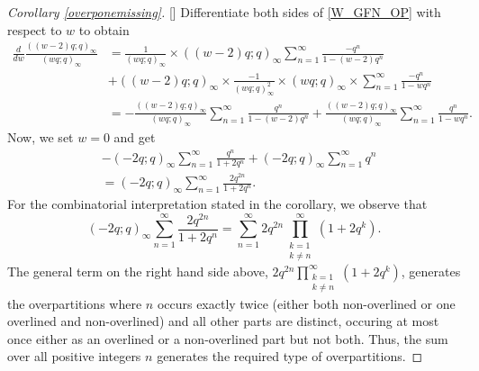 \documentclass[12pt,reqno]{amsart}
\renewcommand{\(}{\left\(}
\renewcommand{\)}{\right\)}
\renewcommand{\[}{\left\[}
\renewcommand{\]}{\right\]}
\numberwithin{equation}{section}
\theoremstyle{plain}
\begin{document}
\begin{proof}[Corollary \textup{\ref{overponemissing}}][]
Differentiate both sides of \eqref{W_GFN_OP} with respect to $w$ to obtain
\begin{align*}
\frac{d}{dw} \frac{((w-2)q; q)_{\infty}}{(wq; q)_{\infty}}&= \frac{1}{(wq; q)_{\infty}} \times ((w-2)q; q)_{\infty} \sum_{n=1}^{\infty}\frac{-q^n}{1 - (w-2) q^n} \\
&+ ((w-2)q; q)_{\infty} \times \frac{-1}{(wq; q)_{\infty}^2} \times (wq; q)_{\infty} \times \sum_{n=1}^{\infty} \frac{-q^n}{1 - wq^n} \\
&= -\frac{((w-2)q; q)_{\infty}}{(wq; q)_{\infty}}\sum_{n=1}^{\infty}\frac{q^n}{1 - (w-2) q^n} + \frac{((w-2)q; q)_{\infty}}{(wq; q)_{\infty}} \sum_{n=1}^{\infty} \frac{q^n}{1 - wq^n}.
\end{align*}
Now, we set $w=0$ and get
\begin{align*}
&-(-2q; q)_{\infty}\sum_{n=1}^{\infty} \frac{q^n}{1 + 2q^n} + (-2q; q)_{\infty}\sum_{n=1}^{\infty}q^n \\
&  = (-2q; q)_{\infty}\sum_{n=1}^{\infty}\frac{2q^{2n}}{1 + 2q^n}.
\end{align*}
For the combinatorial interpretation stated in the corollary, we observe that
\begin{equation*}
(-2q; q)_{\infty}\sum_{n=1}^{\infty}\frac{2q^{2n}}{1 + 2q^n} = \sum_{n=1}^{\infty} 2q^{2n} \prod_{\substack{k=1 \\ k \neq n}}^{\infty} (1+2q^k).
\end{equation*}
The general term on the right hand side above, $2q^{2n} \prod_{\substack{k=1 \\ k \neq n}}^{\infty} (1+2q^k)$, generates the overpartitions where $n$ occurs exactly twice (either both non-overlined or one overlined and non-overlined) and all other parts are distinct, occuring at most once either as an overlined or a non-overlined part but not both. Thus, the sum over all positive integers $n$ generates the required type of overpartitions.
\end{proof}
\end{document}
